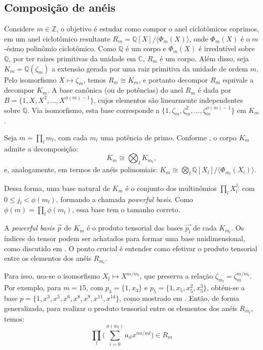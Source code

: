 \subsection{Composição de anéis} 

Considere $m \in \mathbb{Z}$, o objetivo é estudar como compor o anel ciclotômicos coprimos, em um anel ciclotômico resultante $R_m = \mathbb{Q}[X]/\langle\Phi_m(X)\rangle$, onde $\Phi_m(X)$ é o $m$-ésimo polinômio ciclotômico. Como $\mathbb{Q}$ é um corpo e $\Phi_m(X)$ é irredutível sobre $\mathbb{Q}$, por ter raízes primitivas da unidade em $\mathbb{C}$, $R_m$ é um corpo. Além disso, seja $K_m = \mathbb{Q}(\zeta_m)$ a extensão gerada por uma raiz primitiva da unidade de ordem $m$. Pelo isomorfismo $X \mapsto \zeta_m$, temos $R_m \cong K_m$, e portanto decompor $R_m$ equivale a decompor $K_m$. A base canônica (ou de potências) do anel $R_m$ é dada por $B = \{1, X, X^2, \dots, X^{\phi(m)-1}\}$, cujos elementos são linearmente independentes sobre $\mathbb{Q}$. Via isomorfismo, esta base corresponde a $\{1, \zeta_m, \zeta_m^2, \dots, \zeta_m^{\phi(m)-1}\}$ em $K_m$.

Seja $m = \prod_l m_l$, com cada $m_l$ uma potência de primo. Conforme \cite{lyubashevsky2013}, o corpo $K_m$ admite a decomposição:
\begin{equation}
    K_m \cong \bigotimes_l K_{m_l},
\end{equation}
e, analogamente, em termos de anéis polinomiais: $K_m \cong \bigotimes_l \mathbb{Q}[X_l]/\langle\Phi_{m_l}(X_l)\rangle.$

Dessa forma, uma base natural de $K_m$ é o conjunto dos multinômios $\prod_l X_l^{j_l}$ com $0 \leq j_l < \phi(m_l)$, formando a chamada \textit{powerful basis}. Como $\phi(m) = \prod_l \phi(m_l)$, essa base tem o tamanho correto.

A \textit{powerful basis} $\vec{p}$ de $K_m$ é o produto tensorial das bases $\vec{p_l}$ de cada $K_{m_l}$. Os índices do tensor podem ser achatados para formar uma base unidimensional, como discutido em \cite{lyubashevsky2013}. O ponto crucial é entender como efetivar o produto tensorial entre os elementos dos anéis $R_{m_l}$. 

Para isso, usa-se o isomorfismo $X_l \mapsto X^{m/m_l}$, que preserva a relação $\zeta_{m_l} = \zeta_m^{m/m_l}$. Por exemplo, para $m=15$, com $p_3 = \{1, x_3\}$ e $p_5 = \{1, x_5, x_5^2, x_5^3\}$, obtém-se a base $p = \{1, x^3, x^5, x^6, x^8, x^9, x^{11}, x^{14}\}$, como mostrado em \cite{lyubashevsky2013}. Então, de forma generalizada, para realizar o produto tensorial entre os elementos dos anéis $R_{m_l}$, temos:
\begin{equation}
    \prod_{l} \Big( \sum_{i=0}^{\phi(m_l)} a_{il} x^{i m/ml} \Big) \in R_m
\end{equation}

